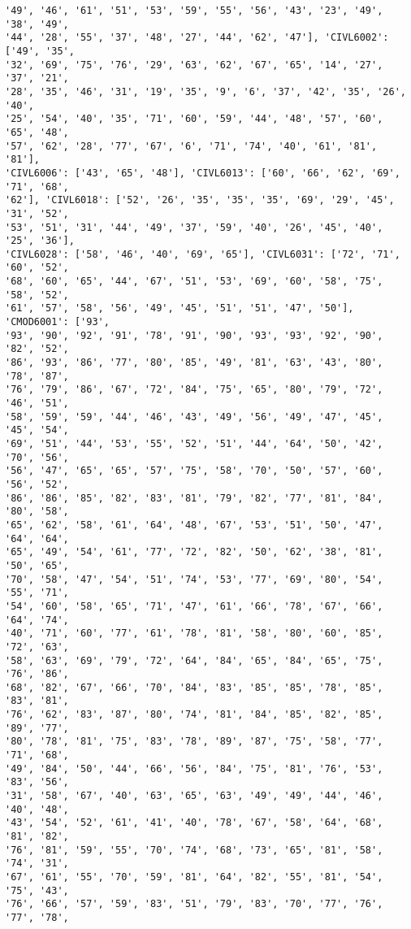\documentclass[11pt]{article}
\begin{document}
\begin{Verbatim}[commandchars=\\\{\}]
'49', '46', '61', '51', '53', '59', '55', '56', '43', '23', '49', '38', '49',
'44', '28', '55', '37', '48', '27', '44', '62', '47'], 'CIVL6002': ['49', '35',
'32', '69', '75', '76', '29', '63', '62', '67', '65', '14', '27', '37', '21',
'28', '35', '46', '31', '19', '35', '9', '6', '37', '42', '35', '26', '40',
'25', '54', '40', '35', '71', '60', '59', '44', '48', '57', '60', '65', '48',
'57', '62', '28', '77', '67', '6', '71', '74', '40', '61', '81', '81'],
'CIVL6006': ['43', '65', '48'], 'CIVL6013': ['60', '66', '62', '69', '71', '68',
'62'], 'CIVL6018': ['52', '26', '35', '35', '35', '69', '29', '45', '31', '52',
'53', '51', '31', '44', '49', '37', '59', '40', '26', '45', '40', '25', '36'],
'CIVL6028': ['58', '46', '40', '69', '65'], 'CIVL6031': ['72', '71', '60', '52',
'68', '60', '65', '44', '67', '51', '53', '69', '60', '58', '75', '58', '52',
'61', '57', '58', '56', '49', '45', '51', '51', '47', '50'], 'CMOD6001': ['93',
'93', '90', '92', '91', '78', '91', '90', '93', '93', '92', '90', '82', '52',
'86', '93', '86', '77', '80', '85', '49', '81', '63', '43', '80', '78', '87',
'76', '79', '86', '67', '72', '84', '75', '65', '80', '79', '72', '46', '51',
'58', '59', '59', '44', '46', '43', '49', '56', '49', '47', '45', '45', '54',
'69', '51', '44', '53', '55', '52', '51', '44', '64', '50', '42', '70', '56',
'56', '47', '65', '65', '57', '75', '58', '70', '50', '57', '60', '56', '52',
'86', '86', '85', '82', '83', '81', '79', '82', '77', '81', '84', '80', '58',
'65', '62', '58', '61', '64', '48', '67', '53', '51', '50', '47', '64', '64',
'65', '49', '54', '61', '77', '72', '82', '50', '62', '38', '81', '50', '65',
'70', '58', '47', '54', '51', '74', '53', '77', '69', '80', '54', '55', '71',
'54', '60', '58', '65', '71', '47', '61', '66', '78', '67', '66', '64', '74',
'40', '71', '60', '77', '61', '78', '81', '58', '80', '60', '85', '72', '63',
'58', '63', '69', '79', '72', '64', '84', '65', '84', '65', '75', '76', '86',
'68', '82', '67', '66', '70', '84', '83', '85', '85', '78', '85', '83', '81',
'76', '62', '83', '87', '80', '74', '81', '84', '85', '82', '85', '89', '77',
'80', '78', '81', '75', '83', '78', '89', '87', '75', '58', '77', '71', '68',
'49', '84', '50', '44', '66', '56', '84', '75', '81', '76', '53', '83', '56',
'31', '58', '67', '40', '63', '65', '63', '49', '49', '44', '46', '40', '48',
'43', '54', '52', '61', '41', '40', '78', '67', '58', '64', '68', '81', '82',
'76', '81', '59', '55', '70', '74', '68', '73', '65', '81', '58', '74', '31',
'67', '61', '55', '70', '59', '81', '64', '82', '55', '81', '54', '75', '43',
'76', '66', '57', '59', '83', '51', '79', '83', '70', '77', '76', '77', '78',

\end{Verbatim}
\end{document}
